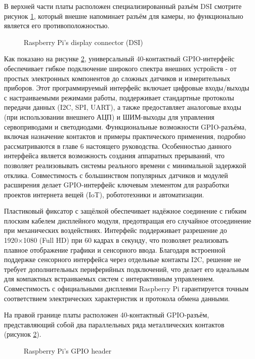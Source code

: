 В верхней части платы расположен специализированный разъём DSI смотрите рисунок \ref{fig:display}, который внешне напоминает разъём для камеры, но функционально является его противоположностью.

\begin{figure}[H]
	\centering
	\caption{Raspberry Pi’s display connector (DSI)}
	\label{fig:display}
\end{figure}

Как показано на рисунке \ref{fig:gpio}, универсальный 40-контактный GPIO-интерфейс обеспечивает гибкое подключение широкого спектра внешних устройств - от простых электронных компонентов до сложных датчиков и измерительных приборов. Этот программируемый интерфейс включает цифровые входы/выходы с настраиваемыми режимами работы, поддерживает стандартные протоколы передачи данных (I2C, SPI, UART), а также предоставляет аналоговые входы (при использовании внешнего АЦП) и ШИМ-выходы для управления сервоприводами и светодиодами. Функциональные возможности GPIO-разъёма, включая назначение контактов и примеры практического применения, подробно рассматриваются в главе 6 настоящего руководства. Особенностью данного интерфейса является возможность создания аппаратных прерываний, что позволяет реализовывать системы реального времени с минимальной задержкой отклика. Совместимость с большинством популярных датчиков и модулей расширения делает GPIO-интерфейс ключевым элементом для разработки проектов интернета вещей (IoT), робототехники и автоматизации.

Пластиковый фиксатор с защёлкой обеспечивает надёжное соединение с гибким плоским кабелем дисплейного модуля, предотвращая его случайное отсоединение при механических воздействиях. Интерфейс поддерживает разрешение до 1920×1080 (Full HD) при 60 кадрах в секунду, что позволяет реализовать плавное отображение графики и сенсорного ввода. Благодаря встроенной поддержке сенсорного интерфейса через отдельные контакты I2C, решение не требует дополнительных периферийных подключений, что делает его идеальным для компактных встраиваемых систем с интерактивным управлением. Совместимость с официальными дисплеями Raspberry Pi гарантируется точным соответствием электрических характеристик и протокола обмена данными.

На правой границе платы расположен 40-контактный GPIO-разъём, представляющий собой два параллельных ряда металлических контактов (рисунок \ref{fig:gpio}).

\begin{figure}[H]
	\centering
	\caption{Raspberry Pi’s GPIO header}
	\label{fig:gpio}
\end{figure}

